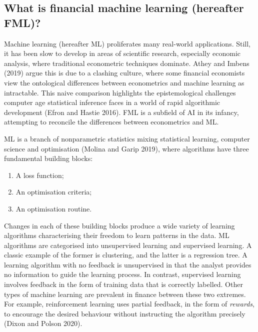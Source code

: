 \documentclass{article}
\begin{document}
\hypertarget{what-is-financial-machine-learning-hereafter-fml}{%
\subsection{What is financial machine learning (hereafter
FML)?}\label{what-is-financial-machine-learning-hereafter-fml}}

Machine learning (hereafter ML) proliferates many real-world
applications. Still, it has been slow to develop in areas of scientific
research, especially economic analysis, where traditional econometric
techniques dominate. Athey and Imbens (2019) argue this is due to a
clashing culture, where some financial economists view the ontological
differences between econometrics and machine learning as intractable.
This naive comparison highlights the epistemological challenges computer
age statistical inference faces in a world of rapid algorithmic
development (Efron and Hastie 2016). FML is a subfield of AI in its
infancy, attempting to reconcile the differences between econometrics
and ML.

ML is a branch of nonparametric statistics mixing statistical learning,
computer science and optimisation (Molina and Garip 2019), where
algorithms have three fundamental building blocks:

\begin{enumerate}
\def\labelenumi{\arabic{enumi}.}
\tightlist
\item
  A loss function;
\item
  An optimisation criteria;
\item
  An optimisation routine.
\end{enumerate}

Changes in each of these building blocks produce a wide variety of
learning algorithms characterising their freedom to learn patterns in
the data. ML algorithms are categorised into unsupervised learning and
supervised learning. A classic example of the former is clustering, and
the latter is a regression tree. A learning algorithm with no feedback
is unsupervised in that the analyst provides no information to guide the
learning process. In contrast, supervised learning involves feedback in
the form of training data that is correctly labelled. Other types of
machine learning are prevalent in finance between these two extremes.
For example, reinforcement learning uses partial feedback, in the form
of \emph{rewards}, to encourage the desired behaviour without
instructing the algorithm precisely (Dixon and Polson 2020).
\end{document}
